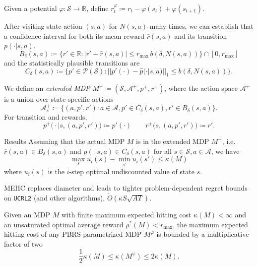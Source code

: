 \documentclass[final]{beamer}
\newlength{\colwidth}
\begin{document}
\begin{frame}[t]
\begin{columns}[t]
\begin{column}{\colwidth}
  Given a potential $\varphi : \mathcal{S} \rightarrow \mathbb{R}$, define $r^\varphi_t \coloneqq r_t -\varphi(s_{t}) + \varphi(s_{t+1})$.
    
  After visiting state-action $(s, a)$ for $N(s, a)$-many times, we can establish that a confidence interval for both its mean reward $\bar{r}(s, a)$ and its transition $p(\cdot|s, a)$. 
  $$ B_\delta(s, a) \coloneqq \big\{r' \in \mathbb{R} : |r' - \hat{r}(s, a)| \leq r_\text{max} \, b(\delta, N(s, a)) \big\} \cap [0, r_\text{max}] $$
  and the statistically plausible transitions are
  $$ C_\delta(s, a) \coloneqq \big\{p' \in \mathcal{P}(\mathcal{S}) : ||p'(\cdot) - \hat{p}(\cdot|s, a)||_1 \leq b(\delta, N(s, a)) \big\}. $$

  We define an \emph{extended MDP} $M^+ \coloneqq (\mathcal{S}, \mathcal{A}^+, p^+, r^+)$, where the action space $\mathcal{A}^+$ is a union over state-specific actions
  $$ \mathcal{A}^+_s \coloneqq \{ (a, p', r') : a \in \mathcal{A}, p' \in C_\delta(s, a), r' \in B_\delta(s, a) \}. $$
  For transition and rewards, 
  $$ p^+\big(\cdot|s, (a, p', r') \big) \coloneqq p'(\cdot) \qquad r^+\big(s, (a, p', r')\big) \coloneqq r'. $$
    
  \begin{block}{Results}
  Assuming that the actual MDP $M$ is in the extended MDP $M^+$, i.e. $\bar{r}(s, a) \in B_\delta(s, a)$ and $p(\cdot|s, a) \in C_\delta(s, a)$ for all $s \in \mathcal{S}, a \in \mathcal{A}$, we have
  $$ \max_s u_i(s) - \min_{s'} u_i(s') \leq \kappa(M) $$
  where $u_i(s)$ is the $i$-step optimal undiscounted value of state $s$.

  MEHC replaces diameter and leads to tighter problem-dependent regret bounds on \texttt{UCRL2} (and other algorithms), $\widetilde{O}(\kappa S \sqrt{A T})$.

  Given an MDP $M$ with finite maximum expected hitting cost $\kappa(M) < \infty$ and an unsaturated optimal average reward $\rho^*(M) < r_\text{max}$, the maximum expected hitting cost of any PBRS-parametrized MDP $M^\varphi$ is bounded by a multiplicative factor of two
  $$ \frac{1}{2} \kappa(M) \leq \kappa(M^\varphi) \leq 2 \kappa(M). $$
  

\end{block}
\end{column}
\end{columns}
\end{frame}
\end{document}
